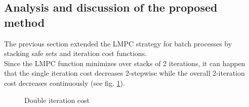 \subsection{Analysis and discussion of the proposed method}
The previous section extended the LMPC strategy for batch processes by stacking safe sets and iteration cost functions.\\
Since the LMPC function minimizes over stacks of 2 iterations, it can happen that the single iteration cost decreases 2-stepwise while the overall 2-iteration cost decreases continuously (see fig. \ref{fig:dynDoubleItCost}).

\begin{figure}[ht]
    \centering
      
    \caption{Double iteration cost}
    \label{fig:dynDoubleItCost}
\end{figure}


